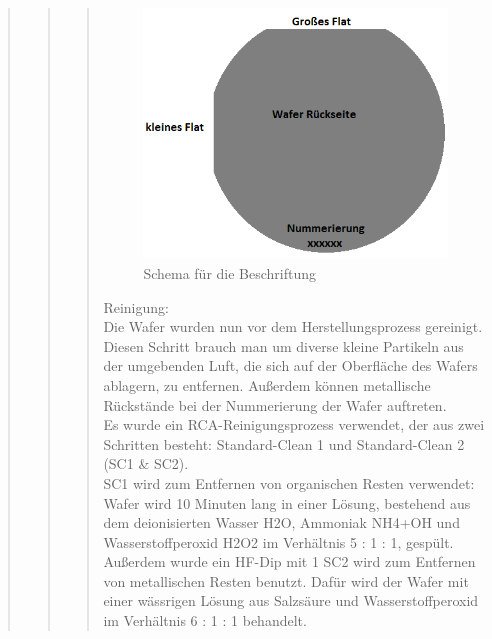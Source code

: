 \begin{quote}
\begin{quote}
\begin{quote}
			\begin{figure}[H]
				\hspace{2.0cm}
                \includegraphics[scale=0.8, trim = 0cm 0cm 0cm 0cm,clip]
                	{./HerstellungBilder/WafRueckseite.png}
                  \caption{Schema für die Beschriftung}
                \label{fig:WafRueckseite}
            \end{figure}
            
            \vspace{2em}
            
            Reinigung:\\
            
            Die Wafer wurden nun vor dem Herstellungsprozess gereinigt. Diesen 
            Schritt brauch man um diverse kleine Partikeln aus der umgebenden 
            Luft, die sich auf der Oberfläche des Wafers ablagern, zu entfernen. 
            Außerdem können metallische Rückstände bei der Nummerierung der 
            Wafer auftreten.\\
			Es wurde ein RCA-Reinigungsprozess verwendet, der aus zwei Schritten 
			besteht: Standard-Clean 1 und Standard-Clean 2 (SC1 & SC2).\\

			SC1 wird zum Entfernen von organischen Resten verwendet: Wafer wird 
			10 Minuten lang in einer Lösung,  bestehend aus dem deionisierten 
			Wasser H2O, Ammoniak NH4+OH und Wasserstoffperoxid H2O2 im 
			Verhältnis 5 : 1 : 1, gespült.\\
			Außerdem wurde ein HF-Dip mit 1 %
			SC2 wird zum Entfernen von metallischen Resten benutzt. Dafür wird 
			der Wafer mit einer wässrigen Lösung aus Salzsäure und 
			Wasserstoffperoxid  im Verhältnis 6 : 1 : 1 behandelt.\\


\end{quote}
\end{quote}
\end{quote}
